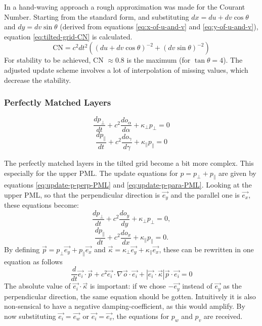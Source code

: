 \documentclass{article}
\begin{document}
In a hand-waving approach a rough approximation was made for the Courant Number.
Starting from the standard form, 
and substituting \(dx = du + dv \cos \theta\) and \(dy = dv \sin \theta\) 
(derived from equations \ref{eq:x-of-u-and-v} and \ref{eq:y-of-u-and-v}),
equation \ref{eq:tilted-grid-CN} is calculated.
\begin{equation}\label{eq:tilted-grid-CN}
    \mbox{CN} = c^2 dt^2 \left( ({du + dv \cos \theta})^{-2} + (dv \sin \theta)^{-2} \right)
\end{equation}
For stability to be achieved, CN \(\approx 0.8\) is the maximum (for \(\tan \theta = 4\)). 
The adjusted update scheme involves a lot of interpolation of missing values,
which decrease the stability.

\subsubsection{Perfectly Matched Layers}

\begin{equation}\label{eq:update-p-perp-PML}
    \frac{dp_\perp}{dt} + c^2 \frac{do_\alpha}{d\alpha} + \kappa_\perp p_\perp = 0
\end{equation}
\begin{equation}\label{eq:update-p-para-PML}
    \frac{dp_\parallel}{dt} + c^2 \frac{do_\gamma}{d\gamma} + \kappa_\parallel p_\parallel = 0
\end{equation}

The perfectly matched layers in the tilted grid become a bit more complex.
This especially for the upper PML.
The update equations for \(p = p_\perp + p_\parallel\) are given by equations \ref{eq:update-p-perp-PML} and \ref{eq:update-p-para-PML}.
Looking at the upper PML, 
so that the perpendicular direction is \(\vec{e_y}\) and the parallel one is \(\vec{e_x}\),
these equations become:
\[ \frac{dp_\perp}{dt} + c^2 \frac{do_y}{dy} + \kappa_\perp p_\perp = 0 , \]
\[ \frac{dp_\parallel}{dt} + c^2 \frac{do_x}{dx} + \kappa_\parallel p_\parallel = 0 . \]
By defining \(\vec{p} = p_\perp \vec{e_y} + p_\parallel \vec{e_x}\) and \(\vec{\kappa} = \kappa_\perp \vec{e_y} + \kappa_\parallel \vec{e_x}\),
these can be rewritten in one equation as follows
\[ \frac{d}{dt} \vec{e_i} \cdot \vec{p} + c^2 \vec{e_i} \cdot \nabla \vec{o} \cdot \vec{e_i} + \left| \vec{e_i} \cdot \vec{\kappa} \right| \vec{p} \cdot \vec{e_i} = 0\]
The absolute value of \(\vec{e_i} \cdot \vec{\kappa}\) is important: 
if we chose \(-\vec{e_y}\) instead of \(\vec{e_y}\) as the perpendicular direction, 
the same equation should be gotten.
Intuitively it is also non-sensical to have a negative damping-coefficient, 
as this would amplify.
By now substituting \(\vec{e_i} = \vec{e_w}\) or \(\vec{e_i} = \vec{e_v}\),
the equations for \(p_w\) and \(p_v\) are received.
\end{document}
